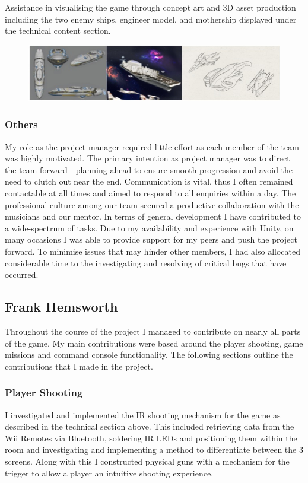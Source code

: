 \documentclass[a4paper,11pt]{article}
\begin{document}
Assistance in visualising the game through concept art and 3D asset production including the two enemy ships, engineer model, and mothership displayed under the technical content section.

\begin{figure}[ht]
	\centering
	\includegraphics[scale = 0.8]{images/dillon_assets}
    \label{fig:conceptart}
\end{figure}
\subsubsection{Others}

My role as the project manager required little effort as each member of the team was highly motivated. The primary intention as project manager was to direct the team forward - planning ahead to ensure smooth progression and avoid the need to clutch out near the end. Communication is vital, thus I often remained contactable at all times and aimed to respond to all enquiries within a day. The professional culture among our team secured a productive collaboration with the musicians and our mentor. In terms of general development I have contributed to a wide-spectrum of tasks. Due to my availability and experience with Unity, on many occasions I was able to provide support for my peers and push the project forward. To minimise issues that may hinder other members, I had also allocated considerable time to the investigating and resolving of critical bugs that have occurred.

\clearpage

\subsection{Frank Hemsworth}
Throughout the course of the project I managed to contribute on nearly all parts of the game. My main contributions were based around the player shooting, game missions and command console functionality. The following sections outline the contributions that I made in the project.

\subsubsection{Player Shooting}
I investigated and implemented the IR shooting mechanism for the game as described in the technical section above. This included retrieving data from the Wii Remotes via Bluetooth, soldering IR LEDs and positioning them within the room and investigating and implementing a method to differentiate between the 3 screens. Along with this I constructed physical guns with a mechanism for the trigger to allow a player an intuitive shooting experience. 
\end{document}
